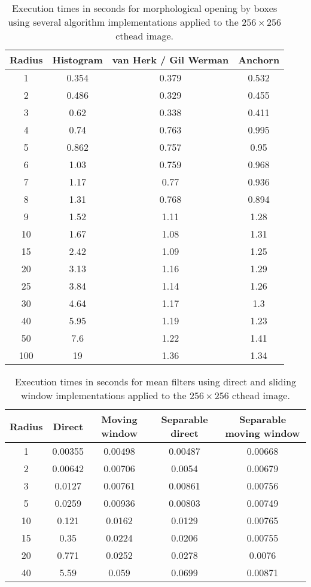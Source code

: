 \documentclass[a4paper]{InsightArticle}
\begin{document}
\begin{table}[phtb]
\centering
\small
\begin{tabular}{cccc}
\hline
Radius	&	Histogram	&	van Herk / Gil Werman	&	Anchorn	\\
\hline
1	&	0.354	&	0.379	&	0.532	\\
2	&	0.486	&	0.329	&	0.455	\\
3	&	0.62	&	0.338	&	0.411	\\
4	&	0.74	&	0.763	&	0.995	\\
5	&	0.862	&	0.757	&	0.95	\\
6	&	1.03	&	0.759	&	0.968	\\
7	&	1.17	&	0.77	&	0.936	\\
8	&	1.31	&	0.768	&	0.894	\\
9	&	1.52	&	1.11	&	1.28	\\
10	&	1.67	&	1.08	&	1.31	\\
15	&	2.42	&	1.09	&	1.25	\\
20	&	3.13	&	1.16	&	1.29	\\
25	&	3.84	&	1.14	&	1.26	\\
30	&	4.64	&	1.17	&	1.3	\\
40	&	5.95	&	1.19	&	1.23	\\
50	&	7.6	&	1.22	&	1.41	\\
100	&	19	&	1.36	&	1.34	\\
\hline
\hline
\end{tabular}
\caption{Execution times in seconds for morphological opening by boxes using several algorithm implementations applied to the $256 \times 256$ cthead image.\label{tab:perf2Dpoly}}
\end{table}


\begin{table}[phtb]
\centering
\small
\begin{tabular}{ccccc}
\hline
Radius	&	Direct	&	Moving window	&	Separable direct	&	Separable moving window	\\
\hline
1	&	0.00355	&	0.00498	&	0.00487	&	0.00668	\\
2	&	0.00642	&	0.00706	&	0.0054	&	0.00679	\\
3	&	0.0127	&	0.00761	&	0.00861	&	0.00756	\\
5	&	0.0259	&	0.00936	&	0.00803	&	0.00749	\\
10	&	0.121	&	0.0162	&	0.0129	&	0.00765	\\
15	&	0.35	&	0.0224	&	0.0206	&	0.00755	\\
20	&	0.771	&	0.0252	&	0.0278	&	0.0076	\\
40	&	5.59	&	0.059	&	0.0699	&	0.00871	\\
\hline
\hline
\end{tabular}
\caption{Execution times in seconds for mean filters using direct and sliding window implementations applied to the $256 \times 256$ cthead image.\label{tab:perfRankMean}}
\end{table}
\end{document}
